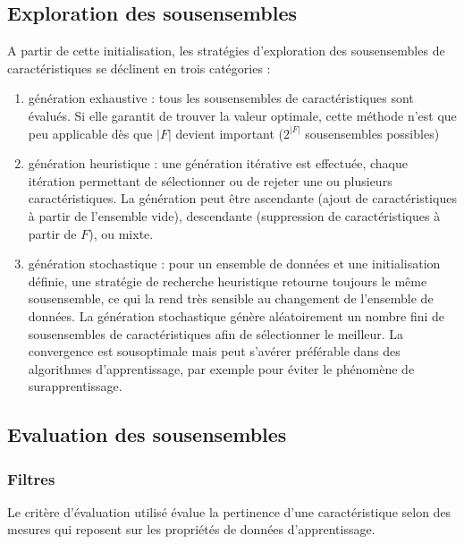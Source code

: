 \documentclass[letterpaper,10pt,english]{jupyterBook}
\begin{document}
\subsection{Exploration des sous\sphinxhyphen{}ensembles}
\label{\detokenize{selection:exploration-des-sous-ensembles}}
\sphinxAtStartPar
A partir de cette initialisation, les stratégies d’exploration des sous\sphinxhyphen{}ensembles de caractéristiques se déclinent en trois catégories :
\begin{enumerate}
%
\item {} 
\sphinxAtStartPar
génération exhaustive : tous les sous\sphinxhyphen{}ensembles de caractéristiques sont évalués. Si elle garantit de trouver la valeur optimale, cette méthode n’est que peu applicable dès que \(|F|\) devient important (\(2^{|F|}\) sous\sphinxhyphen{}ensembles possibles)

\item {} 
\sphinxAtStartPar
génération heuristique : une génération itérative est effectuée, chaque itération permettant de sélectionner ou de rejeter une ou plusieurs caractéristiques. La génération peut être ascendante (ajout de caractéristiques à partir de l’ensemble vide), descendante (suppression de caractéristiques à partir de \(F\)), ou mixte.

\item {} 
\sphinxAtStartPar
génération stochastique : pour un ensemble de données et une initialisation définie, une stratégie de recherche heuristique retourne toujours le même sous\sphinxhyphen{}ensemble, ce qui la rend très sensible au changement
de l’ensemble de données. La génération stochastique génère aléatoirement un nombre fini de sous\sphinxhyphen{}ensembles de caractéristiques afin de sélectionner le meilleur. La convergence est sous\sphinxhyphen{}optimale mais peut s’avérer préférable dans des algorithmes d’apprentissage, par exemple pour éviter le phénomène de surapprentissage.

\end{enumerate}


\subsection{Evaluation des sous\sphinxhyphen{}ensembles}
\label{\detokenize{selection:evaluation-des-sous-ensembles}}

\subsubsection{Filtres}
\label{\detokenize{selection:filtres}}
\sphinxAtStartPar
Le critère d’évaluation utilisé évalue la pertinence d’une caractéristique selon des mesures
qui reposent sur les propriétés de données d’apprentissage.
\end{document}

